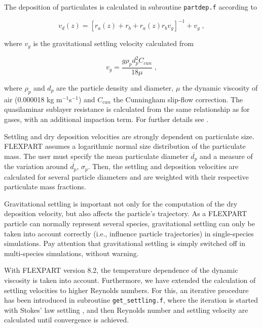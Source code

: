 \documentclass{egu}                  %
\begin{document}
The deposition of particulates is calculated in subroutine \verb|partdep.f|
according to

\begin{equation}
v_d(z)=\left[r_a(z)+r_b+r_a(z)r_bv_g\right]^{-1}+v_g \;,
\end{equation}

where $v_g$ is the gravitational settling velocity calculated from
\citep{slinn1982}

\begin{equation}
v_g=\frac{g \rho_p d_p^2C_{cun}}{18 \mu} \;,
\end{equation}

where $\rho_p$ and $d_p$ are the particle density and diameter, $\mu$ the
dynamic viscosity of air (0.000018 kg m$^{-1}$s$^{-1}$) and $C_{cun}$ the
Cunningham slip-flow correction.  The quasilaminar sublayer resistance is
calculated from the same relationship as for gases, with an additional
impaction term.  For further details see \citet{slinn1982}.\par

Settling and dry deposition velocities are strongly dependent on particulate
size.  FLEXPART assumes a logarithmic normal size distribution of the
particulate mass.  The user must specify the mean particulate diameter
$\overline{d_p}$ and a measure of the variation around $\overline{d_p}$,
$\sigma_p$.  Then, the settling and deposition velocities are calculated for
several particle diameters and are weighted with their respective particulate
mass fractions.

Gravitational settling is important not only for the computation of the dry
deposition velocity, but also affects the particle's trajectory.  As a FLEXPART
particle can normally represent several species, gravitational settling can
only be taken into account correctly (i.e., influence particle trajectories) in
single-species simulations.  Pay attention that gravitational settling is
simply switched off in multi-species simulations, without warning.

With FLEXPART version 8.2, the temperature dependence of the dynamic viscosity
is taken into account.  Furthermore, we have extended the calculation of
settling velocities to higher Reynolds numbers.  For this, an iterative
procedure has been introduced in subroutine \verb|get_settling.f|, where the
iteration is started with Stokes’ law settling \citep{naeslund1991}, and then
Reynolds number and settling velocity are calculated until convergence is
achieved.
\end{document}
